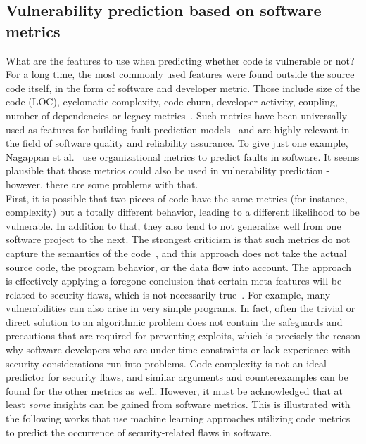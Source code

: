 \documentclass[
a4paper,
pagesize,
pdftex,
12pt,
twoside, %
BCOR=5mm, %
ngerman,
fleqn,
final,
]{scrartcl}
\begin{document}
	\subsection{Vulnerability prediction based on software metrics}
	What are the features to use when predicting whether code is vulnerable or not? For a long time, the most commonly used features were found outside the source code itself, in the form of software and developer metric. Those include size of the code (LOC), cyclomatic complexity, code churn, developer activity, coupling, number of dependencies or legacy metrics~\cite{Morrison.2015}. Such metrics have been universally used as features for building fault prediction models~\cite{Hall.2011} and are highly relevant in the field of software quality and reliability assurance. To give just one example, Nagappan et al.~\cite{Nagappan.2008} use organizational metrics to predict faults in software. It seems plausible that those metrics could also be used in vulnerability prediction - however, there are some problems with that.\\
	First, it is possible that two pieces of code have the same metrics (for instance, complexity) but a totally different behavior, leading to a different likelihood to be vulnerable. In addition to that, they also tend to not generalize well from one software project to the next. The strongest criticism is that such metrics do not capture the semantics of the code~\cite{Shin.2008}, and this approach does not take the actual source code, the program behavior, or the data flow into account. The approach is effectively applying a foregone conclusion that certain meta features will be related to security flaws, which is not necessarily true~\cite{Hovsepyan.2012}. For example, many vulnerabilities can also arise in very simple programs. In fact, often the trivial or direct solution to an algorithmic problem does not contain the safeguards and precautions that are required for preventing exploits, which is precisely the reason why software developers who are under time constraints or lack experience with security considerations run into problems. Code complexity is not an ideal predictor for security flaws, and similar arguments and counterexamples can be found for the other metrics as well. However, it must be acknowledged that at least \textit{some} insights can be gained from software metrics. This is illustrated with the following works that use machine learning approaches utilizing code metrics to predict the occurrence of security-related flaws in software.\\
\end{document}
